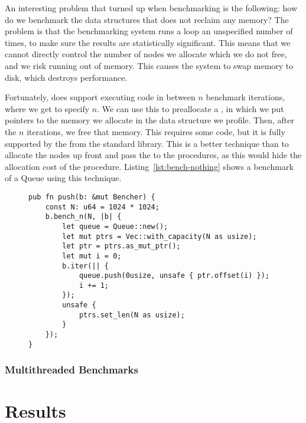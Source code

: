 \documentclass[b5paper]{report}
\begin{document}
An interesting problem that turned up when benchmarking is the following: how do
we benchmark the data structures that does not reclaim any memory? The problem
is that the benchmarking system runs a loop an unspecified number of times, to
make sure the results are statistically significant. This means that we cannot directly control the number of nodes
we allocate which we do not free, and we risk running out of memory. This causes
the system to swap memory to disk, which destroys performance.

Fortunately,  does support executing code in between $n$ benchmark
iterations, where we get to specify $n$. We can use this to preallocate a
, in which we put pointers to the memory we allocate in the data
structure we profile. Then, after the $n$ iterations, we free that memory. This
requires some  code, but it is fully supported by the 
from the standard library. This is a better technique than to allocate the nodes
up front and pass the  to the procedures, as this would hide the
allocation cost of the procedure. Listing~\ref{lst:bench-nothing} shows a
benchmark of a Queue using this technique.

\begin{figure}[ht]
  \begin{lstlisting}[caption=Microbenchmark of a data structure without memory
  reclamation,label=lst:bench-nothing]
pub fn push(b: &mut Bencher) {
    const N: u64 = 1024 * 1024;
    b.bench_n(N, |b| {
        let queue = Queue::new();
        let mut ptrs = Vec::with_capacity(N as usize);
        let ptr = ptrs.as_mut_ptr();
        let mut i = 0;
        b.iter(|| {
            queue.push(0usize, unsafe { ptr.offset(i) });
            i += 1;
        });
        unsafe {
            ptrs.set_len(N as usize);
        }
    });
}
  \end{lstlisting}
\end{figure}


\subsection{Multithreaded Benchmarks}




\chapter{Results}
\end{document}
